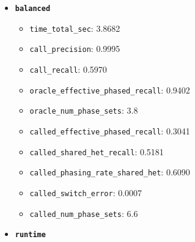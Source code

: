 \documentclass[
]{article}
\providecommand{\tightlist}{%
  \setlength{\itemsep}{0pt}\setlength{\parskip}{0pt}}
\begin{document}
\begin{itemize}
  \begin{itemize}
  \tightlist
  \item
    \texttt{time\_total\_sec}: 3.7970
  \item
    \texttt{call\_precision}: 0.9994
  \item
    \texttt{call\_recall}: 0.5895
  \item
    \texttt{oracle\_effective\_phased\_recall}: 0.9402
  \item
    \texttt{oracle\_num\_phase\_sets}: 3.8
  \item
    \texttt{called\_effective\_phased\_recall}: 0.2964
  \item
    \texttt{called\_shared\_het\_recall}: 0.5098
  \item
    \texttt{called\_phasing\_rate\_shared\_het}: 0.6027
  \item
    \texttt{called\_switch\_error}: 0.0007
  \item
    \texttt{called\_num\_phase\_sets}: 6.6
  \end{itemize}
\item
  \textbf{\texttt{balanced}}

  \begin{itemize}
  \tightlist
  \item
    \texttt{time\_total\_sec}: 3.8682
  \item
    \texttt{call\_precision}: 0.9995
  \item
    \texttt{call\_recall}: 0.5970
  \item
    \texttt{oracle\_effective\_phased\_recall}: 0.9402
  \item
    \texttt{oracle\_num\_phase\_sets}: 3.8
  \item
    \texttt{called\_effective\_phased\_recall}: 0.3041
  \item
    \texttt{called\_shared\_het\_recall}: 0.5181
  \item
    \texttt{called\_phasing\_rate\_shared\_het}: 0.6090
  \item
    \texttt{called\_switch\_error}: 0.0007
  \item
    \texttt{called\_num\_phase\_sets}: 6.6
  \end{itemize}
\item
  \textbf{\texttt{runtime}}


\end{itemize}
\end{document}
